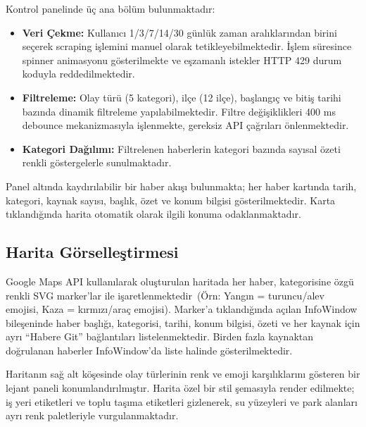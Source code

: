 \documentclass[conference]{IEEEtran}
\begin{document}
    Kontrol panelinde {\"u}{\c c} ana b{\"o}l{\"u}m bulunmaktad{\i}r:

    \begin{itemize}[noitemsep]
    \item \textbf{Veri {\c C}ekme:} Kullan{\i}c{\i} 1/3/7/14/30 g{\"u}nl{\"u}k zaman aral{\i}klar{\i}ndan birini se{\c c}erek scraping i{\c s}lemini manuel olarak tetikleyebilmektedir. {\.I}{\c s}lem s{\"u}resince spinner animasyonu g{\"o}sterilmekte ve e{\c s}zamanl{\i} istekler HTTP 429 durum koduyla reddedilmektedir.
    \item \textbf{Filtreleme:} Olay t{\"u}r{\"u} (5 kategori), il{\c c}e (12 il{\c c}e), ba{\c s}lang{\i}{\c c} ve biti{\c s} tarihi baz{\i}nda dinamik filtreleme yap{\i}labilmektedir. Filtre de{\u g}i{\c s}iklikleri 400 ms debounce mekanizmas{\i}yla i{\c s}lenmekte, gereksiz API {\c c}a{\u g}r{\i}lar{\i} {\"o}nlenmektedir.
    \item \textbf{Kategori Da{\u g}{\i}l{\i}m{\i}:} Filtrelenen haberlerin kategori baz{\i}nda say{\i}sal {\"o}zeti renkli g{\"o}stergelerle sunulmaktad{\i}r.
    \end{itemize}

    Panel alt{\i}nda kayd{\i}r{\i}labilir bir haber ak{\i}{\c s}{\i} bulunmakta; her haber kart{\i}nda tarih, kategori, kaynak say{\i}s{\i}, ba{\c s}l{\i}k, {\"o}zet ve konum bilgisi g{\"o}sterilmektedir. Karta t{\i}kland{\i}{\u g}{\i}nda harita otomatik olarak ilgili konuma odaklanmaktad{\i}r.

    \subsection{Harita G{\"o}rselle{\c s}tirmesi}
    Google Maps API kullan{\i}larak olu{\c s}turulan haritada her haber, kategorisine {\"o}zg{\"u} renkli SVG marker'lar ile i{\c s}aretlenmektedir~({\"O}rn: Yang{\i}n = turuncu/alev emojisi, Kaza = k{\i}rm{\i}z{\i}/ara{\c c} emojisi). Marker'a t{\i}kland{\i}{\u g}{\i}nda a{\c c}{\i}lan InfoWindow bile{\c s}eninde haber ba{\c s}l{\i}{\u g}{\i}, kategorisi, tarihi, konum bilgisi, {\"o}zeti ve her kaynak i{\c c}in ayr{\i} ``Habere Git'' ba{\u g}lant{\i}lar{\i} listelenmektedir. Birden fazla kaynaktan do{\u g}rulanan haberler InfoWindow'da liste halinde g{\"o}sterilmektedir.

    Haritan{\i}n sa{\u g} alt k{\"o}{\c s}esinde olay t{\"u}rlerinin renk ve emoji kar{\c s}{\i}l{\i}klar{\i}n{\i} g{\"o}steren bir lejant paneli konumland{\i}r{\i}lm{\i}{\c s}t{\i}r. Harita {\"o}zel bir stil {\c s}emas{\i}yla render edilmekte; i{\c s} yeri etiketleri ve toplu ta{\c s}{\i}ma etiketleri gizlenerek, su y{\"u}zeyleri ve park alanlar{\i} ayr{\i} renk paletleriyle vurgulanmaktad{\i}r.
\end{document}
